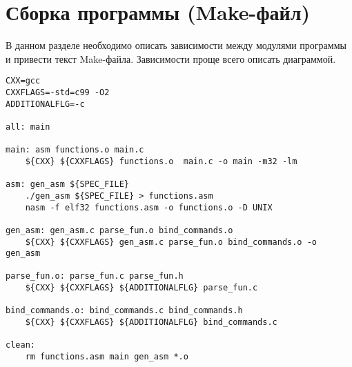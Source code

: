 \documentclass[a4paper,12pt,titlepage,finall]{article}
\begin{document}



\newpage

\section{Сборка программы (Make-файл)}

В данном разделе необходимо описать зависимости между модулями программы
и привести текст Make-файла. Зависимости проще всего описать диаграммой.

\begin{Verbatim}
CXX=gcc
CXXFLAGS=-std=c99 -O2
ADDITIONALFLG=-c

all: main

main: asm functions.o main.c
	${CXX} ${CXXFLAGS} functions.o  main.c -o main -m32 -lm

asm: gen_asm ${SPEC_FILE}
	./gen_asm ${SPEC_FILE} > functions.asm
	nasm -f elf32 functions.asm -o functions.o -D UNIX

gen_asm: gen_asm.c parse_fun.o bind_commands.o
	${CXX} ${CXXFLAGS} gen_asm.c parse_fun.o bind_commands.o -o gen_asm

parse_fun.o: parse_fun.c parse_fun.h
	${CXX} ${CXXFLAGS} ${ADDITIONALFLG} parse_fun.c 

bind_commands.o: bind_commands.c bind_commands.h
	${CXX} ${CXXFLAGS} ${ADDITIONALFLG} bind_commands.c

clean: 
	rm functions.asm main gen_asm *.o
\end{Verbatim}
\end{document}
